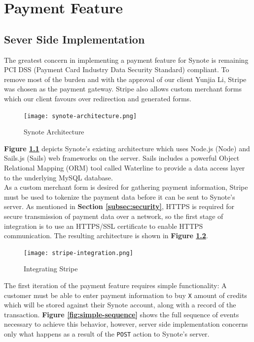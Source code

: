 \chapter{Payment Feature}
\label{chap:payment-feature}


\section{Sever Side Implementation}
\label{sec:server-side-implementation}

The greatest concern in implementing a payment feature for Synote is remaining PCI DSS (Payment Card Industry Data Security Standard) compliant. To remove most of the burden and with the approval of our client Yunjia Li, Stripe was chosen as the payment gateway. Stripe also allows custom merchant forms which our client favours over redirection and generated forms.\\

\begin{figure}[!hbt]
  	\centering
 	\texttt{[image: synote-architecture.png]}
  	\caption{Synote Architecture}
 	\label{fig:synote-architecture}
\end{figure}

\textbf{Figure \ref{fig:synote-architecture}} depicts Synote's existing architecture which uses Node.js (Node) and Sails.js (Sails) web frameworks on the server. Sails includes a powerful Object Relational Mapping (ORM) tool called Waterline to provide a data access layer to the underlying MySQL database.\\

As a custom merchant form is desired for gathering payment information, Stripe must be used to tokenize the payment data before it can be sent to Synote's server. As mentioned in \textbf{Section \ref{subsec:security}}, HTTPS is required for secure transmission of payment data over a network, so the first stage of integration is to use an HTTPS/SSL certificate to enable HTTPS communication. The resulting architecture is shown in \textbf{Figure \ref{fig:stripe-integration}}.\\

\begin{figure}[!hbt]
  	\centering
 	\texttt{[image: stripe-integration.png]}
  	\caption{Integrating Stripe}
 	\label{fig:stripe-integration}
\end{figure}

The first iteration of the payment feature requires simple functionality: A customer must be able to enter payment information to buy \texttt{X} amount of credits which will be stored against their Synote account, along with a record of the transaction. \textbf{Figure \ref{fig:simple-sequence}} shows the full sequence of events necessary to achieve this behavior, however, server side implementation concerns only what happens as a result of the \texttt{POST} action to Synote's server.\\

